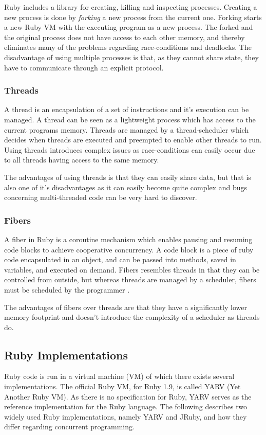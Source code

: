 Ruby includes a library for creating, killing and inspecting processes.
Creating a new process is done by \textit{forking} a new process from the
current one. Forking starts a new Ruby VM with the executing program as a new
process. The forked and the original process does not have access to each
other memory, and thereby eliminates many of the problems regarding
race-conditions and deadlocks. The disadvantage of using multiple processes is
that, as they cannot share state, they have to communicate through an explicit
protocol.

\subsubsection{Threads}
A thread is an encapsulation of a set of instructions and it's execution can
be managed. A thread can be seen as a lightweight process which has access to
the current programs memory. Threads are managed by a thread-scheduler which
decides when threads are executed and preempted to enable other threads to
run. Using threads introduces complex issues as race-conditions can easily
occur due to all threads having access to the same memory.

The advantages of using threads is that they can easily share data, but that
is also one of it's disadvantages as it can easily become quite complex and
bugs concerning multi-threaded code can be very hard to discover.

\subsubsection{Fibers}
A fiber in Ruby is a coroutine mechanism which enables pausing and resuming
code blocks to achieve cooperative concurrency. A code block is a
piece of ruby code encapsulated in an object, and can be passed into
methods, saved in variables, and executed on demand. Fibers resembles threads in
that they can be controlled from outside, but whereas threads are managed by a
scheduler, fibers must be scheduled by the programmer \cite{rubyfiber}.

The advantages of fibers over threads are that they have a significantly lower
memory footprint and doesn't introduce the complexity of a scheduler as
threads do.

\subsection{Ruby Implementations}
Ruby code is run in a virtual machine (VM) of which there exists several
implementations. The official Ruby VM, for Ruby 1.9, is called YARV (Yet
Another Ruby VM). As there is no specification for Ruby, YARV serves as
the reference implementation for the Ruby language. The following describes
two widely used Ruby implementations, namely YARV and JRuby, and how they
differ regarding concurrent programming.

